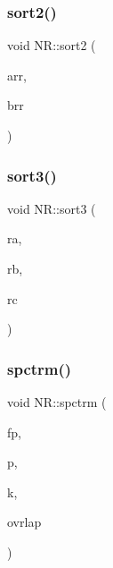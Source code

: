 \subsubsection{\texorpdfstring{sort2()}{sort2()}}
{\footnotesize\ttfamily void N\+R\+::sort2 (\begin{DoxyParamCaption}\item[{\mbox{\hyperlink{namespaceNR_ab293e06a6bf799d8a7ed932b6852bcb8}{Vec\+\_\+\+I\+O\+\_\+\+DP}} \&}]{arr,  }\item[{\mbox{\hyperlink{namespaceNR_ab293e06a6bf799d8a7ed932b6852bcb8}{Vec\+\_\+\+I\+O\+\_\+\+DP}} \&}]{brr }\end{DoxyParamCaption})}

\mbox{\label{namespaceNR_aacbec42c43f9d847e5f0d00b9d978e99}} 
\subsubsection{\texorpdfstring{sort3()}{sort3()}}
{\footnotesize\ttfamily void N\+R\+::sort3 (\begin{DoxyParamCaption}\item[{\mbox{\hyperlink{namespaceNR_ab293e06a6bf799d8a7ed932b6852bcb8}{Vec\+\_\+\+I\+O\+\_\+\+DP}} \&}]{ra,  }\item[{\mbox{\hyperlink{namespaceNR_ab293e06a6bf799d8a7ed932b6852bcb8}{Vec\+\_\+\+I\+O\+\_\+\+DP}} \&}]{rb,  }\item[{\mbox{\hyperlink{namespaceNR_ab293e06a6bf799d8a7ed932b6852bcb8}{Vec\+\_\+\+I\+O\+\_\+\+DP}} \&}]{rc }\end{DoxyParamCaption})}

\mbox{\label{namespaceNR_ae38cea9c6129763058f4b5acebd61ef8}} 
\subsubsection{\texorpdfstring{spctrm()}{spctrm()}}
{\footnotesize\ttfamily void N\+R\+::spctrm (\begin{DoxyParamCaption}\item[{std\+::ifstream \&}]{fp,  }\item[{\mbox{\hyperlink{namespaceNR_a970094d23441f8ef6a45282a7eb2103d}{Vec\+\_\+\+O\+\_\+\+DP}} \&}]{p,  }\item[{const int}]{k,  }\item[{const bool}]{ovrlap }\end{DoxyParamCaption})}

